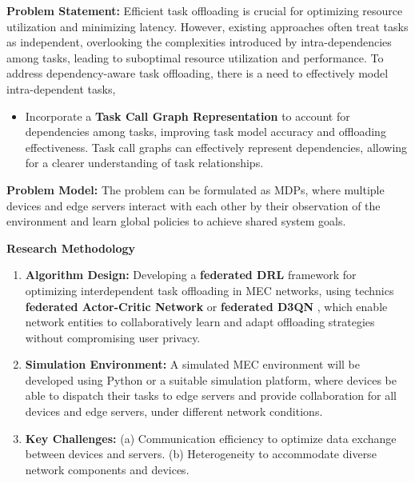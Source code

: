 \documentclass[12pt]{article}
\begin{document}
\vspace{3mm}

\noindent\textbf{\large Problem Statement: }
Efficient task offloading is crucial for optimizing resource utilization and minimizing latency. However, existing approaches often treat tasks as independent, overlooking the complexities introduced by intra-dependencies among tasks, leading to suboptimal resource utilization and performance. To address dependency-aware task offloading, there is a need to effectively model intra-dependent tasks,
\vspace{-1mm}

\begin{itemize}
	\item Incorporate a \textbf{Task Call Graph Representation} \cite{feng2024dependency} to account for dependencies among tasks, improving task model accuracy and offloading effectiveness. Task call graphs can effectively represent dependencies, allowing for a clearer understanding of task relationships. 
\end{itemize}\vspace{-3mm}




\vspace{3mm}

\noindent\textbf{\large Problem Model: } The problem can be formulated as MDPs, where multiple devices and edge servers interact with each other by their observation of the environment and learn global policies to achieve shared system goals.
\noindent



\vspace{5mm}

\noindent\textbf{\large Research Methodology}

\begin{enumerate} \item \textbf{Algorithm Design:} Developing a  \textbf{federated DRL} framework for optimizing interdependent task offloading in MEC networks, using technics \textbf{federated Actor-Critic Network} \cite{zhu2021federated} or \textbf{federated D3QN} \cite{nguyen2021federated}, which enable network entities to collaboratively learn and adapt offloading strategies without compromising user privacy. \item \textbf{Simulation Environment:} A simulated MEC environment will be developed using Python or a suitable simulation platform, where devices be able to dispatch their tasks to edge servers and provide collaboration for all devices and edge servers, under different network conditions. 
	
	
	\item \textbf{Key Challenges:} (a) Communication efficiency to optimize data exchange between devices and servers.  (b) Heterogeneity to accommodate diverse network components and devices.
\end{enumerate}





\end{document}
